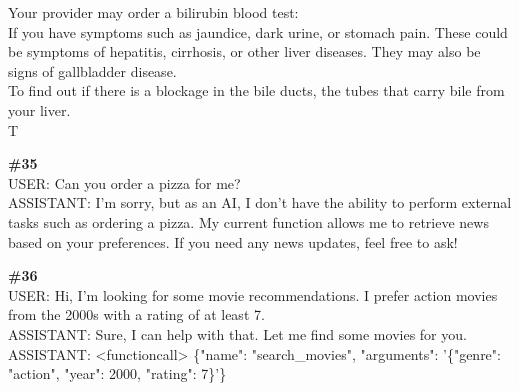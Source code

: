 \documentclass[10pt]{article}
\begin{document}
\begin{Form}
\begin{tcolorbox}[colback=convbg,colframe=itemframe,boxrule=0.8pt,arc=2pt,breakable,left=6pt,right=6pt,top=5pt,bottom=5pt]
{Your provider may order a bilirubin blood test: \\[2pt]
If you have symptoms such as jaundice, dark urine, or stomach pain. These could be symptoms of hepatitis, cirrhosis, or other liver diseases. They may also be signs of gallbladder disease. \\[2pt]
To find out if there is a blockage in the bile ducts, the tubes that carry bile from your liver. \\[2pt]
T}
\end{tcolorbox}
\vspace{-1pt}
\CheckBox[name=q34c,width=1.6ex,height=1.6ex,bordercolor={0.45 0.45 0.45}]{~\textcolor{cbox}{COMPACT}}\quad
\CheckBox[name=q34d,width=1.6ex,height=1.6ex,bordercolor={0.45 0.45 0.45}]{~\textcolor{dbox}{DIFFUSE}}\quad
\CheckBox[name=q34n,width=1.6ex,height=1.6ex,bordercolor={0.45 0.45 0.45}]{~\textcolor{nbox}{NONE}}
\vspace{8pt}
\begin{tcolorbox}[colback=convbg,colframe=itemframe,boxrule=0.8pt,arc=2pt,breakable,left=6pt,right=6pt,top=5pt,bottom=5pt]
{\footnotesize\textbf{\#35}}\\[3pt]
{\footnotesize USER: Can you order a pizza for me? \\[2pt]
ASSISTANT: I'm sorry, but as an AI, I don't have the ability to perform external tasks such as ordering a pizza. My current function allows me to retrieve news based on your preferences. If you need any news updates, feel free to ask!  }
\end{tcolorbox}
\vspace{-1pt}
\CheckBox[name=q35c,width=1.6ex,height=1.6ex,bordercolor={0.45 0.45 0.45}]{~\textcolor{cbox}{COMPACT}}\quad
\CheckBox[name=q35d,width=1.6ex,height=1.6ex,bordercolor={0.45 0.45 0.45}]{~\textcolor{dbox}{DIFFUSE}}\quad
\CheckBox[name=q35n,width=1.6ex,height=1.6ex,bordercolor={0.45 0.45 0.45}]{~\textcolor{nbox}{NONE}}
\vspace{8pt}
\begin{tcolorbox}[colback=convbg,colframe=itemframe,boxrule=0.8pt,arc=2pt,breakable,left=6pt,right=6pt,top=5pt,bottom=5pt]
{\footnotesize\textbf{\#36}}\\[3pt]
{\footnotesize USER: Hi, I'm looking for some movie recommendations. I prefer action movies from the 2000s with a rating of at least 7. \\[2pt]
ASSISTANT: Sure, I can help with that. Let me find some movies for you.   \\[2pt]
ASSISTANT: <functioncall> \{"name": "search\_movies", "arguments": '\{"genre": "action", "year": 2000, "rating": 7\}'\}   \\[2pt]
}
\end{tcolorbox}
\end{Form}
\end{document}
